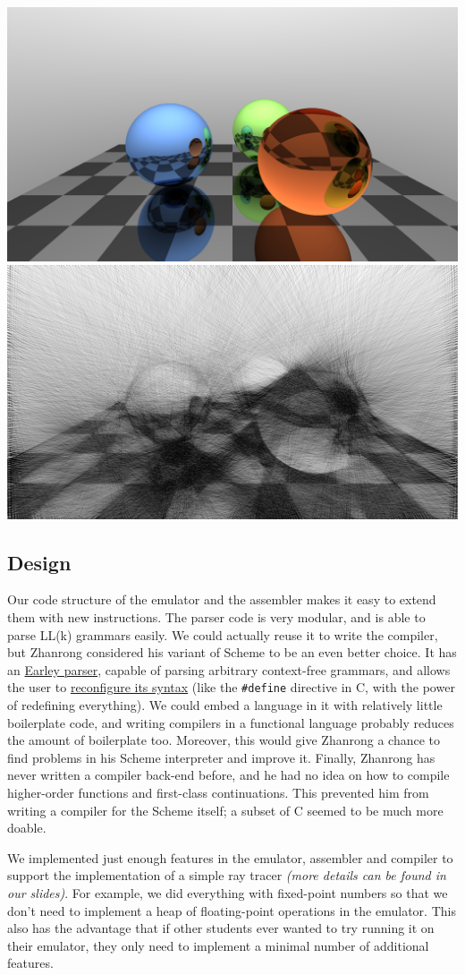 \documentclass[11pt]{article}
\newcommand{\codeword}[1]{\texttt{#1}}
\begin{document}
\includegraphics[width=.49\textwidth]{images/output.png}
\includegraphics[width=.49\textwidth]{images/post.png}

\subsection{Design}

Our code structure of the emulator and the assembler makes it easy to extend them with new instructions. The parser code is very modular, and is able to parse LL(k) grammars easily. We could actually reuse it to write the compiler, but Zhanrong considered his variant of Scheme to be an even better choice. It has an \href{https://en.wikipedia.org/wiki/Earley_parser}{Earley parser}, capable of parsing arbitrary context-free grammars, and allows the user to \href{https://github.com/bridgekat/apimu/blob/main/scripts/prelude.mu}{reconfigure its syntax} (like the \codeword{\#define} directive in C, with the power of redefining everything). We could embed a language in it with relatively little boilerplate code, and writing compilers in a functional language probably reduces the amount of boilerplate too. Moreover, this would give Zhanrong a chance to find problems in his Scheme interpreter and improve it. Finally, Zhanrong has never written a compiler back-end before, and he had no idea on how to compile higher-order functions and first-class continuations. This prevented him from writing a compiler for the Scheme itself; a subset of C seemed to be much more doable.

We implemented just enough features in the emulator, assembler and compiler to support the implementation of a simple ray tracer \textit{(more details can be found in our slides)}. For example, we did everything with fixed-point numbers so that we don’t need to implement a heap of floating-point operations in the emulator. This also has the advantage that if other students ever wanted to try running it on their emulator, they only need to implement a minimal number of additional features.
\end{document}
